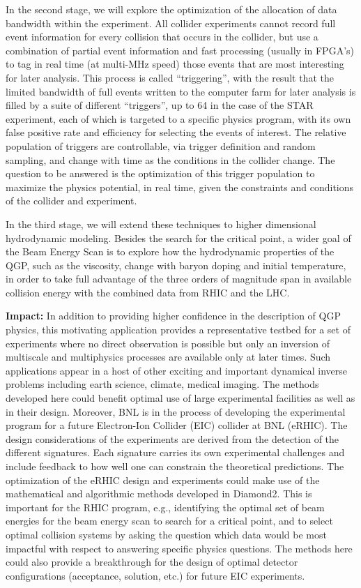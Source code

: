 \documentclass[11pt]{article}
\begin{document}
In the second stage, we will explore the optimization
of the allocation of data bandwidth within the experiment.
All collider experiments cannot record full event information
for every collision that occurs in the collider, but use a combination
of partial event information and fast processing (usually in FPGA's)
to tag in real time (at multi-MHz speed) those events
that are most interesting for later analysis.  This process is 
called ``triggering'', with the result that the limited bandwidth
of full events written to the computer farm for later analysis
is filled by a suite of different ``triggers'', up to 64 in the 
case of the STAR experiment, each of which is targeted to
a specific physics program, with its own false positive
rate and efficiency for selecting the events of interest.
 The relative population of triggers are controllable, 
via trigger definition and random
sampling, and change with time as the conditions in the 
collider change.  The question to be answered is the optimization
of this trigger population to maximize the physics potential, in real time,
given the constraints and conditions of the collider and experiment.

In the third stage, we will extend these techniques to 
higher dimensional hydrodynamic modeling.  Besides
the search for the critical point, a wider goal of the Beam Energy
Scan is to explore how the hydrodynamic properties
of the QGP, such as the viscosity, change with baryon 
doping and initial temperature, in order to take 
full advantage of the three orders of magnitude span
in available collision energy with the combined data from RHIC
and the LHC.   

{\bf Impact:} In addition to providing higher confidence in the
description of QGP physics, this motivating application provides a
representative testbed for a set of experiments where no direct
observation is possible but only an inversion of multiscale and
multiphysics processes are available only at later times.  Such
applications appear in a host of other exciting and important
dynamical inverse problems including earth science, climate, medical
imaging. The methods developed here could benefit optimal use of large
experimental facilities as well as in their design.  Moreover, BNL is
in the process of developing the experimental program for a future
Electron-Ion Collider (EIC) collider at BNL (eRHIC). The design
considerations of the experiments are derived from the detection of
the different signatures. Each signature carries its own experimental
challenges and include feedback to how well one can constrain the
theoretical predictions.  The optimization of the eRHIC design and
experiments could make use of the mathematical and algorithmic methods
developed in Diamond2.  This is important for the RHIC program, e.g.,
identifying the optimal set of beam energies for the beam energy scan
to search for a critical point, and to select optimal collision
systems by asking the question which data would be most impactful with
respect to answering specific physics questions.  The methods here
could also provide a breakthrough for the design of optimal detector
configurations (acceptance, solution, etc.) for future EIC
experiments.
\end{document}
